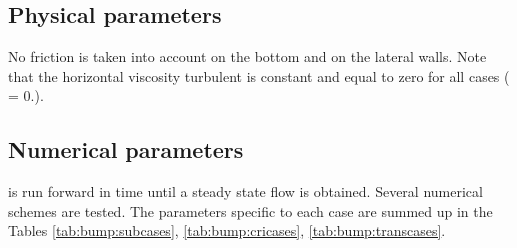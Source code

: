 \subsection{Physical parameters}

No friction is taken into account on the bottom and on the lateral walls.
Note that the horizontal viscosity turbulent is constant and equal to zero for all cases
( = 0.).

\subsection{Numerical parameters}

 is run forward in time until a steady state flow is obtained.
Several numerical schemes are tested.
The parameters specific to each case are summed up in the Tables
\ref{tab:bump:subcases}, \ref{tab:bump:cricases}, \ref{tab:bump:transcases}.

